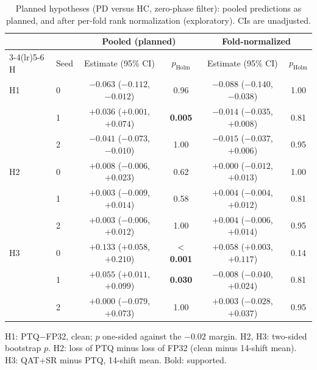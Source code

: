 \documentclass[preprint,12pt]{elsarticle}
\begin{document}
\begin{table}[!t]
\caption{Planned hypotheses (PD versus HC, zero-phase filter): pooled predictions as planned, and after per-fold rank normalization (exploratory). CIs are unadjusted.}
\label{tab:hyp}
\centering\scriptsize
\setlength{\tabcolsep}{2.5pt}
\begin{tabular*}{\linewidth}{@{\extracolsep{\fill}}llcccc@{}}
\toprule
 & & \multicolumn{2}{c}{Pooled (planned)} & \multicolumn{2}{c}{Fold-normalized} \\
\cmidrule(lr){3-4}\cmidrule(lr){5-6}
H & Seed & Estimate (95\% CI) & $p_\text{Holm}$ & Estimate (95\% CI) & $p_\text{Holm}$ \\
\midrule
H1 & 0 & $-0.063$ ($-0.112$, $-0.012$) & 0.96 & $-0.088$ ($-0.140$, $-0.038$) & 1.00 \\
 & 1 & $+0.036$ ($+0.001$, $+0.074$) & \textbf{0.005} & $-0.014$ ($-0.035$, $+0.008$) & 0.81 \\
 & 2 & $-0.041$ ($-0.073$, $-0.010$) & 1.00 & $-0.015$ ($-0.037$, $+0.006$) & 0.95 \\
H2 & 0 & $+0.008$ ($-0.006$, $+0.023$) & 0.62 & $+0.000$ ($-0.012$, $+0.013$) & 1.00 \\
 & 1 & $+0.003$ ($-0.009$, $+0.014$) & 0.58 & $+0.004$ ($-0.004$, $+0.012$) & 0.81 \\
 & 2 & $+0.003$ ($-0.006$, $+0.012$) & 1.00 & $+0.004$ ($-0.006$, $+0.014$) & 0.95 \\
H3 & 0 & $+0.133$ ($+0.058$, $+0.210$) & \textbf{$<$0.001} & $+0.058$ ($+0.003$, $+0.117$) & 0.14 \\
 & 1 & $+0.055$ ($+0.011$, $+0.099$) & \textbf{0.030} & $-0.008$ ($-0.040$, $+0.024$) & 0.81 \\
 & 2 & $+0.000$ ($-0.079$, $+0.073$) & 1.00 & $+0.003$ ($-0.028$, $+0.037$) & 0.95 \\
\bottomrule
\end{tabular*}

\vspace{2pt}\parbox{\linewidth}{\footnotesize H1: PTQ$-$FP32, clean; $p$ one-sided against the $-0.02$ margin. H2, H3: two-sided bootstrap $p$. H2: loss of PTQ minus loss of FP32 (clean minus 14-shift mean). H3: QAT+SR minus PTQ, 14-shift mean. Bold: supported.}
\end{table}
\end{document}
